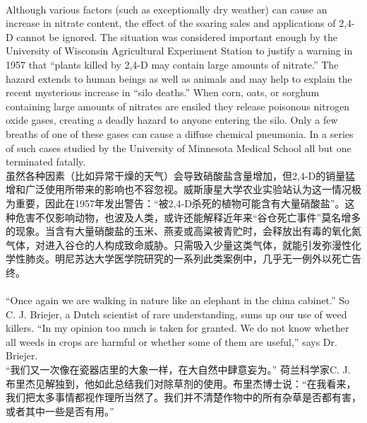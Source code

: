 \documentclass{article}
\begin{document}
\\
Although various factors (such as exceptionally dry weather) can cause an increase in nitrate content, the effect of the soaring sales and applications of 2,4-D cannot be ignored. The situation was considered important enough by the University of Wisconsin Agricultural Experiment Station to justify a warning in 1957 that “plants killed by 2,4-D may contain large amounts of nitrate.” The hazard extends to human beings as well as animals and may help to explain the recent mysterious increase in “silo deaths.” When corn, oats, or sorghum containing large amounts of nitrates are ensiled they release poisonous nitrogen oxide gases, creating a deadly hazard to anyone entering the silo. Only a few breaths of one of these gases can cause a diffuse chemical pneumonia. In a series of such cases studied by the University of Minnesota Medical School all but one terminated fatally. \\
虽然各种因素（比如异常干燥的天气）会导致硝酸盐含量增加，但2,4-D的销量猛增和广泛使用所带来的影响也不容忽视。威斯康星大学农业实验站认为这一情况极为重要，因此在1957年发出警告：“被2,4-D杀死的植物可能含有大量硝酸盐”。这种危害不仅影响动物，也波及人类，或许还能解释近年来“谷仓死亡事件”莫名增多的现象。当含有大量硝酸盐的玉米、燕麦或高粱被青贮时，会释放出有毒的氧化氮气体，对进入谷仓的人构成致命威胁。只需吸入少量这类气体，就能引发弥漫性化学性肺炎。明尼苏达大学医学院研究的一系列此类案例中，几乎无一例外以死亡告终。\\

\\
“Once again we are walking in nature like an elephant in the china cabinet.” So C. J. Briejer, a Dutch scientist of rare understanding, sums up our use of weed killers. “In my opinion too much is taken for granted. We do not know whether all weeds in crops are harmful or whether some of them are useful,” says Dr. Briejer.\\
“我们又一次像在瓷器店里的大象一样，在大自然中肆意妄为。” 荷兰科学家C. J. 布里杰见解独到，他如此总结我们对除草剂的使用。布里杰博士说：“在我看来，我们把太多事情都视作理所当然了。我们并不清楚作物中的所有杂草是否都有害，或者其中一些是否有用。” \\
\end{document}
